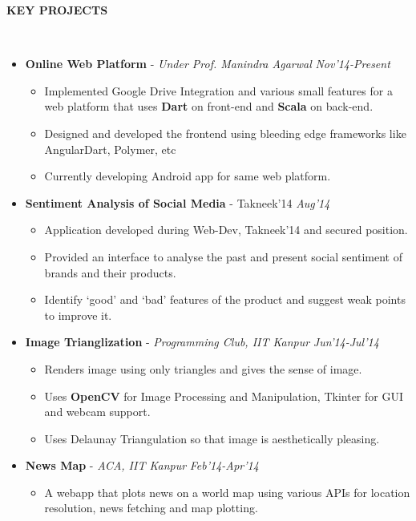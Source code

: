 \documentclass[a4paper,10pt]{article}
\newcommand{\lsep}{-0.5cm}
\newcommand{\resheading}[1]{{\small \colorbox{mygrey}{\begin{minipage}{0.975\textwidth}{\textbf{#1 \vphantom{p\^{E}}}}\end{minipage}}}}
\begin{document}
        \resheading{\textbf{KEY PROJECTS} }\\[\lsep]
        \begin{itemize} \itemsep -1mm
        \item
          \textbf{Online Web Platform} - \textit{Under Prof. Manindra Agarwal}
          \hfill \textit{Nov'14-Present}
          \vspace{-2mm}\begin{itemize} \itemsep -2pt
\item Implemented Google Drive
          Integration and various
          small features for a web platform
          that uses \textbf{Dart} on front-end
          and \textbf{Scala} on back-end. 
\item Designed and developed the frontend using bleeding edge frameworks like AngularDart, Polymer, etc 
\item Currently
          developing Android app for
          same web platform.
\end{itemize}
        \item  \textbf{Sentiment Analysis of Social Media} - {\footnotesize
            Takneek'14 }   \hfill \textit{ Aug'14
}          \vspace{-2mm}\begin{itemize} \itemsep -2pt
          \item Application developed during Web-Dev, Takneek'14 and secured \textbf{} position.
          \item Provided an interface to analyse the past and present social sentiment of brands and their products.
          \item  Identify `good' and `bad' features of the product and suggest weak points to improve it.
          \end{itemize}
        \item
          \textbf{Image Trianglization} - \textit{ Programming Club, IIT Kanpur }                  \hfill \textit{Jun'14-Jul'14}
          \vspace{-2mm}\begin{itemize}  \itemsep -2pt
          \item Renders image using only triangles and gives the sense of image.
          \item Uses \textbf{OpenCV} for Image Processing and Manipulation,
            Tkinter for GUI and webcam support.
          \item Uses Delaunay Triangulation so that image is aesthetically pleasing.
          \end{itemize}
        \item
          \textbf{News Map} - \textit{ ACA, IIT Kanpur }
          \hfill  \textit{Feb'14-Apr'14}
          \vspace{-2mm}\begin{itemize} \itemsep -2pt
          \item A webapp that plots news on a world map  using various APIs for location resolution, news fetching and map plotting.
          \end{itemize}
        \end{itemize}
\end{document}
